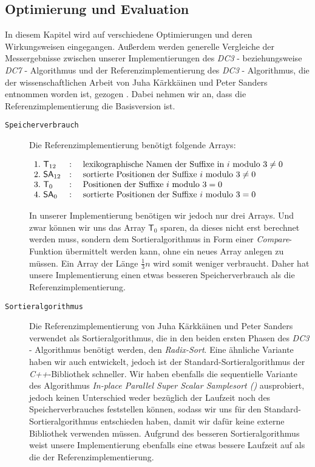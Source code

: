 \subsection{Optimierung und Evaluation}
\label{dc3:optim}

In  diesem Kapitel wird auf verschiedene Optimierungen und deren Wir\-kungs\-wei\-sen eingegangen. Außerdem werden generelle Vergleiche der Mess\-er\-geb\-nis\-se zwischen unserer Implementierungen des \emph{DC3} - beziehungsweise \emph{DC7} - Algorithmus und der Referenzimplementierung des \emph{DC3} - Algorithmus, die der wissenschaftlichen Arbeit von Juha Kärkkäinen und Peter Sanders entnommen worden ist, gezogen \cite[p.~954,955]{saca:9}. Dabei nehmen wir an, dass die Referenzimplementierung die Basisversion ist.

\begin{description}
	\item[\texttt{Speicherverbrauch}]

	Die Referenzimplementierung benötigt folgende Arrays:

	$\begin{array}{lcl}
	1. \text{  } \mathsf{T}_{12} & : & \text{ lexikographische Namen der Suffixe in } 	i \text{ modulo } 3 \neq 0\\
	2. \text{  } \sa_{12}& : & \text{ sortierte Positionen der Suffixe } 		i \text{ modulo } 3 \neq 0\\
	3. \text{  } \mathsf{T}_0	& : & \text{ Positionen der Suffixe } 					i \text{ modulo } 3 = 0\\
	4. \text{  } \sa_0	& : & \text{ sortierte Positionen der Suffixe } 		i \text{ modulo } 3 = 0
	\end{array}$

	In unserer Implementierung benötigen wir jedoch nur drei Arrays. Und zwar können wir uns das Array $\mathsf{T}_{0}$ sparen, da dieses nicht erst berechnet werden muss, sondern dem Sortieralgorithmus in Form einer \emph{Compare}-Funktion übermittelt werden kann, ohne ein neues Array anlegen zu müssen. Ein Array der Länge $\frac{1}{3}n$ wird somit weniger verbraucht. Daher hat unsere Implementierung einen etwas besseren Speicherverbrauch als die Referenzimplementierung.

	\item[\texttt{Sortieralgorithmus}]

	Die Referenzimplementierung von Juha Kärkkäinen und Peter Sanders verwendet als Sortieralgorithmus, die in den beiden ersten Phasen des \emph{DC3} - Algorithmus benötigt werden, den \emph{Radix-Sort}. Eine ähnliche Variante haben wir auch entwickelt, jedoch ist der Standard-Sortieralgorithmus der \emph{C++}-Bibliothek schneller. Wir haben ebenfalls die sequentielle Variante des Algorithmus \emph{In-place Parallel Super Scalar Samplesort (\ipsviero)} ausprobiert, jedoch keinen Unterschied weder bezüglich der Laufzeit noch des Speicherverbrauches feststellen können, sodass wir uns für den Standard-Sortieralgorithmus entschieden haben, damit wir dafür keine externe Bibliothek verwenden müssen. Aufgrund des besseren Sortieralgorithmus weist unsere Implementierung ebenfalls eine etwas bessere Laufzeit auf als die der Referenzimplementierung.


\end{description}
